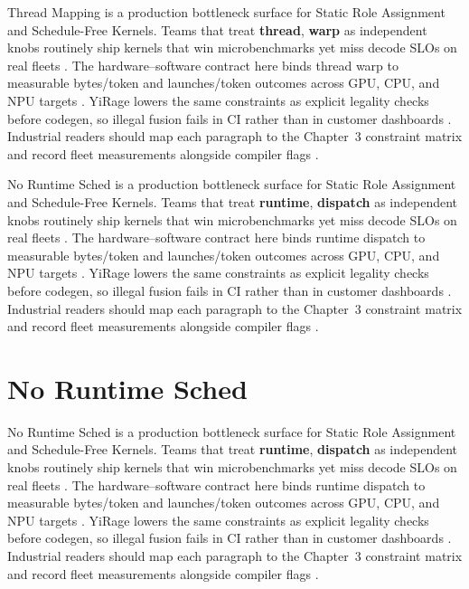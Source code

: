 Thread Mapping is a production bottleneck surface for Static Role Assignment and Schedule-Free Kernels. Teams that treat \textbf{thread}, \textbf{warp} as independent knobs routinely ship kernels that win microbenchmarks yet miss decode SLOs on real fleets \citep{patel2025llminference,nvidia2022hopper}. The hardware--software contract here binds thread warp to measurable bytes/token and launches/token outcomes across GPU, CPU, and NPU targets \citep{taxbreak2026,semianalysis2024tma}. YiRage lowers the same constraints as explicit legality checks before codegen, so illegal fusion fails in CI rather than in customer dashboards \citep{memoryfloor2026,amd2024xdna}. Industrial readers should map each paragraph to the Chapter~3 constraint matrix and record fleet measurements alongside compiler flags \citep{nvidia2022hopper,amd2024aie}.

No Runtime Sched is a production bottleneck surface for Static Role Assignment and Schedule-Free Kernels. Teams that treat \textbf{runtime}, \textbf{dispatch} as independent knobs routinely ship kernels that win microbenchmarks yet miss decode SLOs on real fleets \citep{taxbreak2026,semianalysis2024tma}. The hardware--software contract here binds runtime dispatch to measurable bytes/token and launches/token outcomes across GPU, CPU, and NPU targets \citep{memoryfloor2026,amd2024xdna}. YiRage lowers the same constraints as explicit legality checks before codegen, so illegal fusion fails in CI rather than in customer dashboards \citep{nvidia2022hopper,amd2024aie}. Industrial readers should map each paragraph to the Chapter~3 constraint matrix and record fleet measurements alongside compiler flags \citep{semianalysis2024tma,dlbook}.

\section{No Runtime Sched}
\label{sec:no_runtime_sched}

No Runtime Sched is a production bottleneck surface for Static Role Assignment and Schedule-Free Kernels. Teams that treat \textbf{runtime}, \textbf{dispatch} as independent knobs routinely ship kernels that win microbenchmarks yet miss decode SLOs on real fleets \citep{memoryfloor2026,amd2024xdna}. The hardware--software contract here binds runtime dispatch to measurable bytes/token and launches/token outcomes across GPU, CPU, and NPU targets \citep{nvidia2022hopper,amd2024aie}. YiRage lowers the same constraints as explicit legality checks before codegen, so illegal fusion fails in CI rather than in customer dashboards \citep{semianalysis2024tma,dlbook}. Industrial readers should map each paragraph to the Chapter~3 constraint matrix and record fleet measurements alongside compiler flags \citep{amd2024xdna,dao2022flashattention}.

